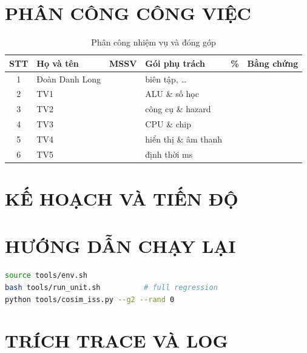 \chapter{PHÂN CÔNG CÔNG VIỆC}
\begin{table}[htbp]\centering
\caption{Phân công nhiệm vụ và đóng góp}
\begin{tabularx}{\linewidth}{|c|l|c|X|c|X|}
\hline
\textbf{STT} & \textbf{Họ và tên} & \textbf{MSSV} & \textbf{Gói phụ trách} & \textbf{\%} & \textbf{Bằng chứng} \\ \hline
1 & Đoàn Danh Long & & biên tập, \ldots & & \\ \hline
2 & TV1 & & ALU \& số học & & \\ \hline
3 & TV2 & & công cụ \& hazard & & \\ \hline
4 & TV3 & & CPU \& chip & & \\ \hline
5 & TV4 & & hiển thị \& âm thanh & & \\ \hline
6 & TV5 & & định thời ms & & \\ \hline
\end{tabularx}
\end{table}

\chapter{KẾ HOẠCH VÀ TIẾN ĐỘ}

\chapter{HƯỚNG DẪN CHẠY LẠI}
\begin{lstlisting}[language=bash,numbers=none]
source tools/env.sh
bash tools/run_unit.sh          # full regression
python tools/cosim_iss.py --g2 --rand 0
\end{lstlisting}

\chapter{TRÍCH TRACE VÀ LOG}
